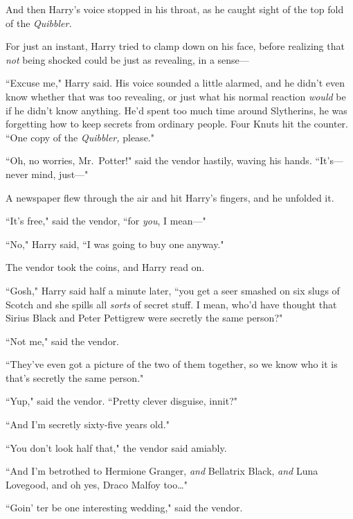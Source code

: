And then Harry's voice stopped in his throat, as he caught sight of the top fold of the \emph{Quibbler.}


For just an instant, Harry tried to clamp down on his face, before realizing that \emph{not} being shocked could be just as revealing, in a sense---

``Excuse me," Harry said. His voice sounded a little alarmed, and he didn't even know whether that was too revealing, or just what his normal reaction \emph{would} be if he didn't know anything. He'd spent too much time around Slytherins, he was forgetting how to keep secrets from ordinary people. Four Knuts hit the counter. ``One copy of the \emph{Quibbler,} please."

``Oh, no worries, Mr.~Potter!" said the vendor hastily, waving his hands. ``It's---never mind, just---"

A newspaper flew through the air and hit Harry's fingers, and he unfolded it.


``It's free," said the vendor, ``for \emph{you}, I mean---"

``No," Harry said, ``I was going to buy one anyway."

The vendor took the coins, and Harry read on.

``Gosh," Harry said half a minute later, ``you get a seer smashed on six slugs of Scotch and she spills all \emph{sorts} of secret stuff. I mean, who'd have thought that Sirius Black and Peter Pettigrew were secretly the same person?"

``Not me," said the vendor.

``They've even got a picture of the two of them together, so we know who it is that's secretly the same person."

``Yup," said the vendor. ``Pretty clever disguise, innit?"

``And I'm secretly sixty-five years old."

``You don't look half that," the vendor said amiably.

``And I'm betrothed to Hermione Granger, \emph{and} Bellatrix Black, \emph{and} Luna Lovegood, and oh yes, Draco Malfoy too{\ldots}"

``Goin' ter be one interesting wedding," said the vendor.

